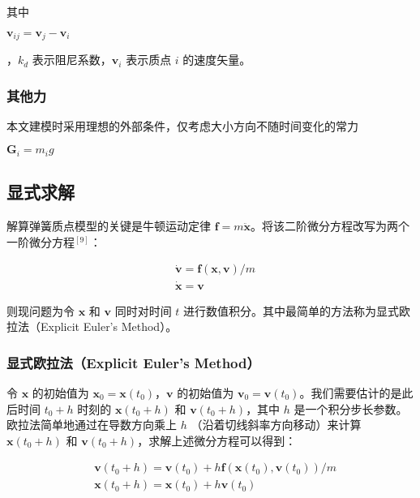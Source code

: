 \documentclass[UTF8]{ctexart}
\begin{document}
其中 \begin{large}$\mathbf{v}_{ij} = \mathbf{v}_j - \mathbf{v}_i$\end{large}，$k_d$ 表示阻尼系数，$\mathbf{v}_i$ 表示质点 $i$ 的速度矢量。 \par

\subsubsection{其他力}

本文建模时采用理想的外部条件，仅考虑大小方向不随时间变化的常力 \begin{large}$\mathbf{G}_i = m_i g$\end{large} \par

\subsection{显式求解}

解算弹簧质点模型的关键是牛顿运动定律 $\mathbf{f} = m \ddot{\mathbf{x}}$。将该二阶微分方程改写为两个一阶微分方程${}^{[9]}$：

\begin{large}
\begin{equation}
\begin{split}
&\dot{\mathbf{v}} = \mathbf{f}(\mathbf{x}, \mathbf{v}) / m \\
&\dot{\mathbf{x}} = \mathbf{v}
\end{split}
\end{equation}
\end{large}

则现问题为令 $\mathbf{x}$ 和 $\mathbf{v}$ 同时对时间 $t$ 进行数值积分。其中最简单的方法称为显式欧拉法（Explicit Euler's Method）。

\subsubsection{显式欧拉法（Explicit Euler's Method）}

令 $\mathbf{x}$ 的初始值为 $\mathbf{x}_0 = \mathbf{x}(t_0)$，$\mathbf{v}$ 的初始值为 $\mathbf{v}_0 = \mathbf{v}(t_0)$。我们需要估计的是此后时间 $t_0 + h$ 时刻的 $\mathbf{x}(t_0+h)$ 和 $\mathbf{v}(t_0 + h)$，其中 $h$ 是一个积分步长参数。欧拉法简单地通过在导数方向乘上 $h$ （沿着切线斜率方向移动）来计算 $\mathbf{x}(t_0+h)$ 和 $\mathbf{v}(t_0 + h)$，求解上述微分方程可以得到：

\begin{large}
\begin{equation}
\begin{split}
& \mathbf{v}(t_0 + h) = \mathbf{v}(t_0) + h \mathbf{f}(\mathbf{x}(t_0), \mathbf{v}(t_0)) / m \\
& \mathbf{x}(t_0 + h) = \mathbf{x}(t_0) + h \mathbf{v} (t_0)
\end{split}
\end{equation}
\end{large}
\end{document}
